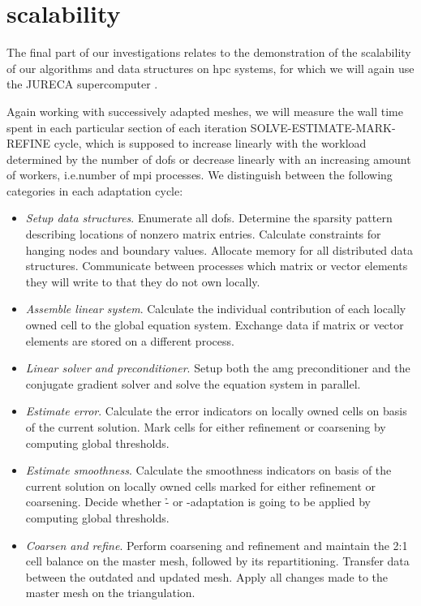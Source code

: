 \section{ scalability}
\label{sec:scaling}

The final part of our investigations relates to the demonstration of the scalability of our algorithms and data structures on \gls{hpc} systems, for which we will again use the JURECA supercomputer \parencite{krause2016}.

Again working with successively adapted meshes, we will measure the wall time spent in each particular section of each iteration SOLVE-ESTIMATE-MARK-REFINE cycle, which is supposed to increase linearly with the workload determined by the number of \glspl{dof} or decrease linearly with an increasing amount of workers, i.e.\@ number of \gls{mpi} processes. We distinguish between the following categories in each adaptation cycle:
\begin{itemize}
\item \textit{Setup data structures}. Enumerate all \glspl{dof}. Determine the sparsity pattern describing locations of nonzero matrix entries. Calculate constraints for hanging nodes and boundary values. Allocate memory for all distributed data structures. Communicate between processes which matrix or vector elements they will write to that they do not own locally.
\item \textit{Assemble linear system}. Calculate the individual contribution of each locally owned cell to the global equation system. Exchange data if matrix or vector elements are stored on a different process.
\item \textit{Linear solver and preconditioner}. Setup both the \gls{amg} preconditioner and the conjugate gradient solver and solve the equation system in parallel.
\item \textit{Estimate error}. Calculate the error indicators on locally owned cells on basis of the current solution. Mark cells for either refinement or coarsening by computing global thresholds.
\item \textit{Estimate smoothness}. Calculate the smoothness indicators on basis of the current solution on locally owned cells marked for either refinement or coarsening. Decide whether \h- or \p-adaptation is going to be applied by computing global thresholds.
\item \textit{Coarsen and refine}. Perform coarsening and refinement and maintain the 2:1 cell balance on the \pforest{} master mesh, followed by its repartitioning. Transfer data between the outdated and updated mesh. Apply all changes made to the master mesh on the \dealii{} triangulation.
\end{itemize}

